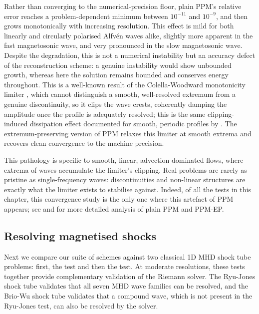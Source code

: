 Rather than converging to the numerical-precision floor, plain PPM's relative error reaches a problem-dependent minimum between $10^{-11}$ and $10^{-9}$, and then grows monotonically with increasing resolution. This effect is mild for both linearly and circularly polarised Alfv\'en waves alike, slightly more apparent in the fast magnetosonic wave, and very pronounced in the slow magnetosonic wave. Despite the degradation, this is not a numerical instability but an accuracy defect of the reconstruction scheme: a genuine instability would show unbounded growth, whereas here the solution remains bounded and conserves energy throughout. This is a well-known result of the Colella-Woodward monotonicity limiter \citep{Colella84a}, which cannot distinguish a smooth, well-resolved extremum from a genuine discontinuity, so it clips the wave crests, coherently damping the amplitude once the profile is adequately resolved; this is the same clipping-induced dissipation effect documented for smooth, periodic profiles by \citet{Felker18a}. The extremum-preserving version of PPM \citep[PPM-EP;][]{Rider07a} relaxes this limiter at smooth extrema and recovers clean convergence to the machine precision.

This pathology is specific to smooth, linear, advection-dominated flows, where extrema of waves accumulate the limiter's clipping. Real problems are rarely as pristine as single-frequency waves: discontinuities and non-linear structures are exactly what the limiter exists to stabilise against. Indeed, of all the tests in this chapter, this convergence study is the only one where this artefact of PPM appears; see  and  for more detailed analysis of plain PPM and PPM-EP.

\subsection{Resolving magnetised shocks}
\label{sec:scheme-comparison:shocks}

Next we compare our suite of schemes against two classical 1D MHD shock tube problems: first, the \citet{RyuJones95a} test and then the \citet{Brio88a} test. At moderate resolutions, these tests together provide complementary validation of the Riemann solver. The Ryu-Jones shock tube validates that all seven MHD wave families can be resolved, and the Brio-Wu shock tube validates that a compound wave, which is not present in the Ryu-Jones test, can also be resolved by the solver.

